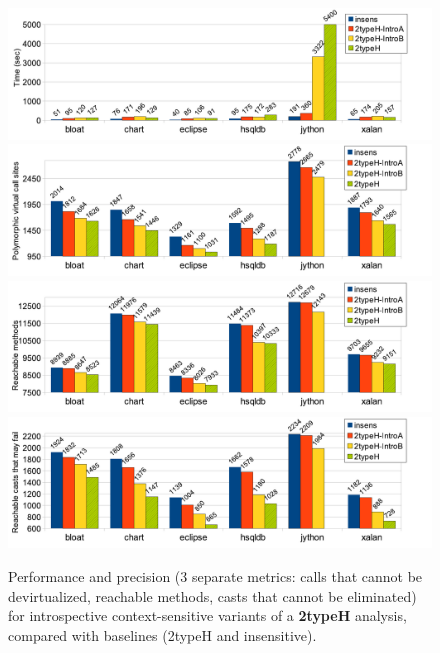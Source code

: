 \begin{figure}[h!tp]
\begin{center}
\includegraphics[scale=0.54]{assets/introspective/2typeHtime.pdf} \\
\includegraphics[scale=0.54]{assets/introspective/2typeHvcalls.pdf} \\
\includegraphics[scale=0.54]{assets/introspective/2typeHmeths.pdf} \\
\includegraphics[scale=0.54]{assets/introspective/2typeHcasts.pdf}
\end{center}
\caption[Performance and precision of introspective variants of a 2typeH analysis]{Performance and precision (3 separate metrics: calls that cannot be devirtualized, reachable methods, casts that cannot be eliminated) for introspective context-sensitive variants of a \textbf{2typeH} analysis, compared with baselines (2typeH and insensitive).}
\label{fig:introspect:2typeH-chart}
\end{figure}


